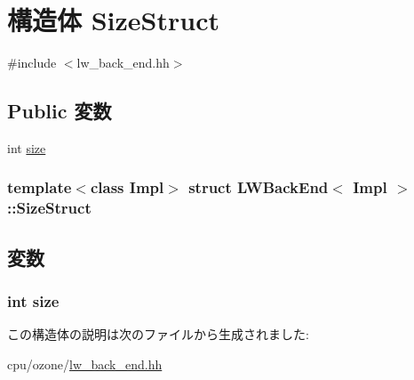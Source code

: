 \hypertarget{structLWBackEnd_1_1SizeStruct}{
\section{構造体 SizeStruct}
\label{structLWBackEnd_1_1SizeStruct}
}


{\ttfamily \#include $<$lw\_\-back\_\-end.hh$>$}\subsection*{Public 変数}
\begin{DoxyCompactItemize}
\item 
int \hyperlink{structLWBackEnd_1_1SizeStruct_a439227feff9d7f55384e8780cfc2eb82}{size}
\end{DoxyCompactItemize}
\subsubsection*{template$<$class Impl$>$ struct LWBackEnd$<$ Impl $>$::SizeStruct}



\subsection{変数}
\hypertarget{structLWBackEnd_1_1SizeStruct_a439227feff9d7f55384e8780cfc2eb82}{
\subsubsection[{size}]{\setlength{\rightskip}{0pt plus 5cm}int {\bf size}}}
\label{structLWBackEnd_1_1SizeStruct_a439227feff9d7f55384e8780cfc2eb82}


この構造体の説明は次のファイルから生成されました:\begin{DoxyCompactItemize}
\item 
cpu/ozone/\hyperlink{lw__back__end_8hh}{lw\_\-back\_\-end.hh}\end{DoxyCompactItemize}
